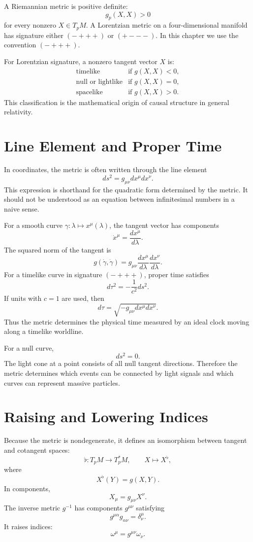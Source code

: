 A Riemannian metric is positive definite:
\[
g_p(X,X)>0
\]
for every nonzero \(X\in T_pM\). A Lorentzian metric on a four-dimensional
manifold has signature either \((-+++)\) or \((+---)\). In this chapter we use
the convention \((-+++)\).

For Lorentzian signature, a nonzero tangent vector \(X\) is:
\[
\begin{array}{ll}
\text{timelike} & \text{if } g(X,X)<0,\\
\text{null or lightlike} & \text{if } g(X,X)=0,\\
\text{spacelike} & \text{if } g(X,X)>0.
\end{array}
\]
This classification is the mathematical origin of causal structure in general
relativity.

\clearpage

\section{Line Element and Proper Time}

In coordinates, the metric is often written through the line element
\[
ds^2=g_{\mu\nu}dx^\mu dx^\nu.
\]
This expression is shorthand for the quadratic form determined by the metric.
It should not be understood as an equation between infinitesimal numbers in a
naive sense.

For a smooth curve \(\gamma:\lambda\mapsto x^\mu(\lambda)\), the tangent vector
has components
\[
\dot{x}^\mu=\frac{dx^\mu}{d\lambda}.
\]
The squared norm of the tangent is
\[
g(\dot{\gamma},\dot{\gamma})
=g_{\mu\nu}\frac{dx^\mu}{d\lambda}
\frac{dx^\nu}{d\lambda}.
\]
For a timelike curve in signature \((-+++)\), proper time satisfies
\[
d\tau^2=-\frac{1}{c^2}ds^2.
\]
If units with \(c=1\) are used, then
\[
d\tau=\sqrt{-g_{\mu\nu}dx^\mu dx^\nu}.
\]
Thus the metric determines the physical time measured by an ideal clock moving
along a timelike worldline.

For a null curve,
\[
ds^2=0.
\]
The light cone at a point consists of all null tangent directions. Therefore the
metric determines which events can be connected by light signals and which
curves can represent massive particles.

\clearpage

\section{Raising and Lowering Indices}

Because the metric is nondegenerate, it defines an isomorphism between tangent
and cotangent spaces:
\[
\flat:T_pM\to T_p^*M,
\qquad
X\mapsto X^\flat,
\]
where
\[
X^\flat(Y)=g(X,Y).
\]
In components,
\[
X_\mu=g_{\mu\nu}X^\nu.
\]
The inverse metric \(g^{-1}\) has components \(g^{\mu\nu}\) satisfying
\[
g^{\mu\alpha}g_{\alpha\nu}=\delta^\mu_\nu.
\]
It raises indices:
\[
\omega^\mu=g^{\mu\nu}\omega_\nu.
\]


